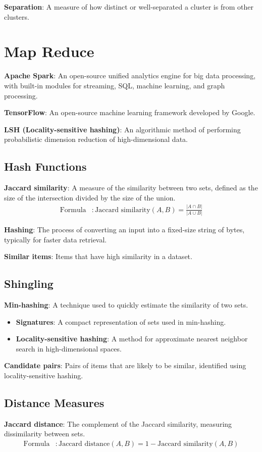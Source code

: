 \documentclass{article}
\begin{document}
\textbf{Separation}: A measure of how distinct or well-separated a cluster is from other clusters.

\section{Map Reduce}

\textbf{Apache Spark}: An open-source unified analytics engine for big data processing, with built-in modules for streaming, SQL, machine learning, and graph processing.

\textbf{TensorFlow}: An open-source machine learning framework developed by Google.

\textbf{LSH (Locality-sensitive hashing)}: An algorithmic method of performing probabilistic dimension reduction of high-dimensional data.

\subsection{Hash Functions}
\textbf{Jaccard similarity}: A measure of the similarity between two sets, defined as the size of the intersection divided by the size of the union.
\begin{align*}
    \text{Formula} &: \text{Jaccard similarity}(A, B) = \frac{|A \cap B|}{|A \cup B|}
\end{align*}

\textbf{Hashing}: The process of converting an input into a fixed-size string of bytes, typically for faster data retrieval.

\textbf{Similar items}: Items that have high similarity in a dataset.

\subsection{Shingling}
\textbf{Min-hashing}: A technique used to quickly estimate the similarity of two sets.
\begin{itemize}
    \item \textbf{Signatures}: A compact representation of sets used in min-hashing.
    \item \textbf{Locality-sensitive hashing}: A method for approximate nearest neighbor search in high-dimensional spaces.
\end{itemize}

\textbf{Candidate pairs}: Pairs of items that are likely to be similar, identified using locality-sensitive hashing.

\subsection{Distance Measures}
\textbf{Jaccard distance}: The complement of the Jaccard similarity, measuring dissimilarity between sets.
\begin{align*}
    \text{Formula} &: \text{Jaccard distance}(A, B) = 1 - \text{Jaccard similarity}(A, B)
\end{align*}
\end{document}
